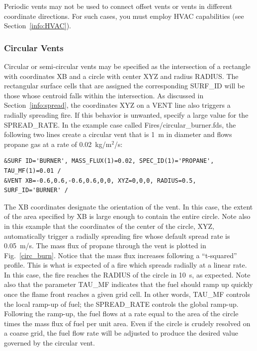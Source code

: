 \documentclass[11pt]{book}
\begin{document}
Periodic vents may not be used to connect offset vents or vents in different coordinate directions.  For such cases, you must employ HVAC capabilities (see Section~\ref{info:HVAC}).

\subsubsection{Circular Vents}
\label{sec:circvents}

Circular or semi-circular vents may be specified as the intersection of a rectangle with coordinates {\ct XB} and a circle with center {\ct XYZ} and radius {\ct RADIUS}.  The rectangular surface cells that are assigned the corresponding {\ct SURF\_ID} will be those whose centroid falls within the intersection. As discussed in Section~\ref{info:spread}, the coordinates {\ct XYZ} on a {\ct VENT} line also triggers a radially spreading fire.  If this behavior is unwanted, specify a large value for the {\ct SPREAD\_RATE}. In the example case called {\ct Fires/circular\_burner.fds}, the following two lines create a circular vent that is 1~m in diameter and flows propane gas at a rate of 0.02~kg/m$^2$/s:
\begin{lstlisting}
&SURF ID='BURNER', MASS_FLUX(1)=0.02, SPEC_ID(1)='PROPANE', TAU_MF(1)=0.01 /
&VENT XB=-0.6,0.6,-0.6,0.6,0,0, XYZ=0,0,0, RADIUS=0.5, SURF_ID='BURNER' /
\end{lstlisting}
The {\ct XB} coordinates designate the orientation of the vent. In this case, the extent of the area specified by {\ct XB} is large enough to contain the entire circle. Note also in this example that the coordinates of the center of the circle, {\ct XYZ}, automatically trigger a radially spreading fire whose default spread rate is 0.05~m/s. The mass flux of propane through the vent is plotted in Fig.~\ref{circ_burn}. Notice that the mass flux increases following a ``t-squared'' profile. This is what is expected of a fire which spreads radially at a linear rate. In this case, the fire reaches the {\ct RADIUS} of the circle in 10~s, as expected. Note also that the parameter {\ct TAU\_MF} indicates that the fuel should ramp up quickly once the flame front reaches a given grid cell. In other words, {\ct TAU\_MF} controls the local ramp-up of fuel; the {\ct SPREAD\_RATE} controls the global ramp-up. Following the ramp-up, the fuel flows at a rate equal to the area of the circle times the mass flux of fuel per unit area. Even if the circle is crudely resolved on a coarse grid, the fuel flow rate will be adjusted to produce the desired value governed by the circular vent.
\end{document}
